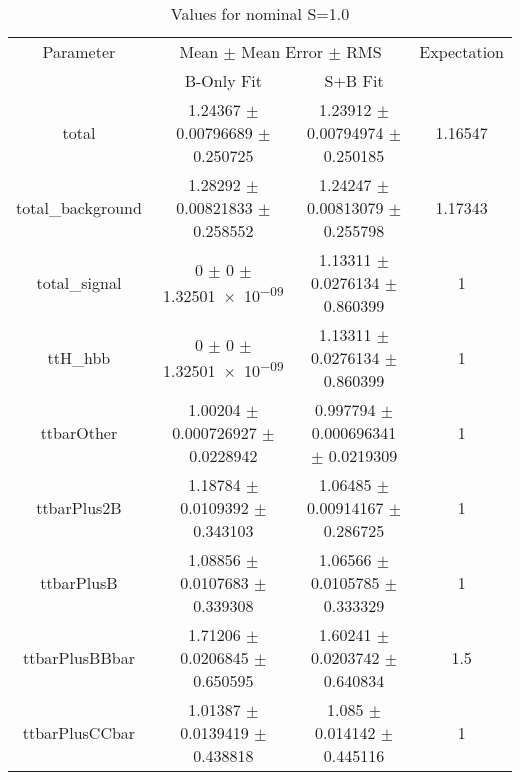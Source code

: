 \begin{table}
\centering
\caption{Values for nominal S=1.0}
\begin{tabular}{cccc}
\toprule
Parameter & \multicolumn{2}{c}{Mean $\pm$ Mean Error $\pm$ RMS} & Expectation\\
 & B-Only Fit & S+B Fit & \\
\midrule
total & \num{1.24367} $\pm$ \num{0.00796689} $\pm$ \num{0.250725} & \num{1.23912} $\pm$ \num{0.00794974} $\pm$ \num{0.250185} & \num{1.16547}\\
total\_background & \num{1.28292} $\pm$ \num{0.00821833} $\pm$ \num{0.258552} & \num{1.24247} $\pm$ \num{0.00813079} $\pm$ \num{0.255798} & \num{1.17343}\\
total\_signal & \num{0} $\pm$ \num{0} $\pm$ \num{1.32501e-09} & \num{1.13311} $\pm$ \num{0.0276134} $\pm$ \num{0.860399} & \num{1}\\
ttH\_hbb & \num{0} $\pm$ \num{0} $\pm$ \num{1.32501e-09} & \num{1.13311} $\pm$ \num{0.0276134} $\pm$ \num{0.860399} & \num{1}\\
ttbarOther & \num{1.00204} $\pm$ \num{0.000726927} $\pm$ \num{0.0228942} & \num{0.997794} $\pm$ \num{0.000696341} $\pm$ \num{0.0219309} & \num{1}\\
ttbarPlus2B & \num{1.18784} $\pm$ \num{0.0109392} $\pm$ \num{0.343103} & \num{1.06485} $\pm$ \num{0.00914167} $\pm$ \num{0.286725} & \num{1}\\
ttbarPlusB & \num{1.08856} $\pm$ \num{0.0107683} $\pm$ \num{0.339308} & \num{1.06566} $\pm$ \num{0.0105785} $\pm$ \num{0.333329} & \num{1}\\
ttbarPlusBBbar & \num{1.71206} $\pm$ \num{0.0206845} $\pm$ \num{0.650595} & \num{1.60241} $\pm$ \num{0.0203742} $\pm$ \num{0.640834} & \num{1.5}\\
ttbarPlusCCbar & \num{1.01387} $\pm$ \num{0.0139419} $\pm$ \num{0.438818} & \num{1.085} $\pm$ \num{0.014142} $\pm$ \num{0.445116} & \num{1}\\
\bottomrule
\end{tabular}
\end{table}